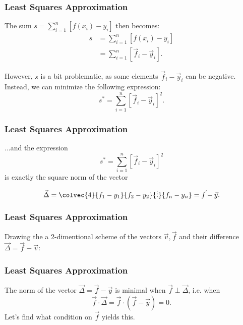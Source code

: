 \begin{frame}
	\frametitle{Least Squares Approximation}
	The sum $s=\sum\limits_{i=1}^{n}\left[f\left( x_{i}\right)-y_{i}\right]$ then becomes:
	\begin{align*}
		s &= \sum\limits_{i=1}^{n}\left[f\left( x_{i}\right)-y_{i}\right]\\
		&= \sum\limits_{i=1}^{n}\left[\vec{f}_{i} - \vec{y}_{i}\right].
	\end{align*}

	However, $s$ is a bit problematic, as some elements $\vec{f}_{i}-\vec{y}_{i}$ can be negative. Instead, we can minimize the following expression:
	\begin{equation*}
		s^{*} = \sum\limits_{i=1}^{n}\left[\vec{f}_{i} - \vec{y}_{i}\right]^{2}.
	\end{equation*}
\end{frame}

\begin{frame}
	\frametitle{Least Squares Approximation}
	...and the expression
	\begin{equation*}
		s^{*} = \sum\limits_{i=1}^{n}\left[\vec{f}_{i} - \vec{y}_{i}\right]^{2}
	\end{equation*}
	is exactly the square norm of the vector
	\begin{equation*}
		\vec{\Delta} = \colvec{4}{f_{1}-y_{1}}{f_{2}-y_{2}}{\vdots}{f_{n}-y_{n}} = \vec{f} - \vec{y}.
	\end{equation*}

\end{frame}

\begin{frame}
	\frametitle{Least Squares Approximation}
	Drawing the a 2-dimentional scheme of the vectors $\vec{v}, \vec{f}$ and their difference $\vec{\Delta}=\vec{f}-\vec{v}$:
	\begin{figure}[H]
		\centering
	\end{figure}
\end{frame}

\begin{frame}
	\frametitle{Least Squares Approximation}
	The norm of the vector $\vec{\Delta}=\vec{f}-\vec{y}$ is minimal when $\vec{f} \perp \vec{\Delta}$, i.e. when
	\begin{equation*}
		\vec{f} \cdot \vec{\Delta} = \vec{f} \cdot \left( \vec{f}-\vec{y} \right) = 0.
	\end{equation*}
	Let's find what condition on $\vec{f}$ yields this.
\end{frame}

